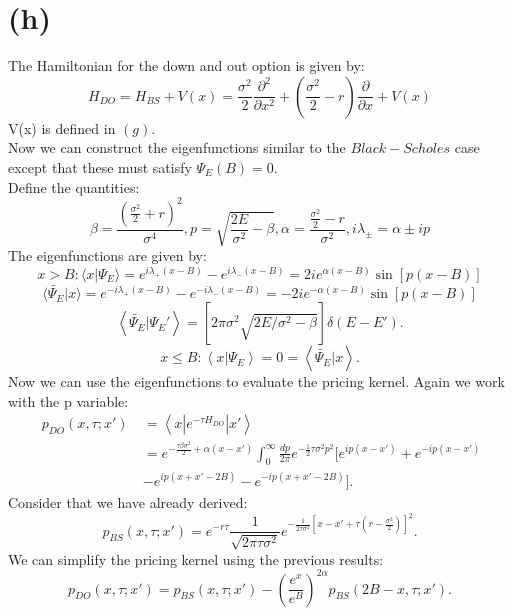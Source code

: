 \documentclass[12pt,a4paper]{paper}
\begin{document}
\section{(h)}
\indent The Hamiltonian for the down and out option is given by:
\begin{equation}
H_{DO}=H_{BS}+V(x)=\frac{\sigma ^2}{2}\frac{\partial ^2}{\partial x^2}+(\frac{\sigma ^2}{2}-r)\frac{\partial}{\partial x}+V(x)
\end{equation}
V(x) is defined in $(g)$.\\
\indent Now we can construct the eigenfunctions similar to the $Black-Scholes$ case except that these must satisfy $\Psi _{E}(B)=0$.\\
\indent Define the quantities:
\begin{equation}
\beta =\frac{(\frac{\sigma ^2 }{2}+r)^2}{\sigma ^4}, p=\sqrt{\frac{2E}{\sigma ^2}-\beta},\alpha =\frac{\frac{\sigma ^2}{2}-r}{\sigma ^2}, i\lambda _{\pm}=\alpha \pm ip
\end{equation}
\indent The eigenfunctions are given by:
\begin{equation}
x>B:\langle x|\Psi_{E}\rangle =e^{i\lambda_{+}(x-B)}-e^{i\lambda_{-}(x-B)}=2ie^{\alpha (x-B)}\sin{[p(x-B)]}
\end{equation}
\begin{equation}
\langle \widetilde{\Psi_{E}}|x\rangle =e^{-i\lambda_{+}(x-B)}-e^{-i\lambda_{-}(x-B)}=-2ie^{-\alpha (x-B)}\sin{[p(x-B)]}
\end{equation}
\begin{equation}
\left \langle \widetilde{\Psi _{E}} | {\Psi_{E}}' \right \rangle=[2\pi \sigma ^2 \sqrt{2E/\sigma ^2 -\beta }] \delta (E-{E}').
\end{equation}
\begin{equation}
x \leq B: \left \langle x | \Psi _{E} \right \rangle=0=\left \langle \widetilde{\Psi _{E}} | x \right \rangle.
\end{equation}
\indent Now we can use the eigenfunctions to evaluate the pricing kernel. Again we work with the p variable:
\begin{align*}
\ p_{DO}(x,\tau;{x}')\
& =  \left \langle x | e^{-\tau H_{DO}} | {x}' \right \rangle \\
& = e^{-\frac{\tau \beta \sigma ^2}{2}+\alpha (x-{x}')}\int_{0}^{\infty }\frac{dp}{2\pi }e^{-\frac{1}{2}\tau \sigma ^2 p^2} [e^{ip(x-{x}')}+e^{-ip(x-{x}')}\\
& -e^{ip(x+{x}'-2B)}-e^{-ip(x+{x}'-2B)}].\
\end{align*}
\indent Consider that we have already derived:
\begin{equation}
p_{BS}(x,\tau;{x}')=e^{-r\tau}\frac{1}{\sqrt{2\pi \tau \sigma ^2}}e^{-\frac{1}{2\tau \sigma ^2}[x-{x}'+\tau(r-\frac{\sigma ^2}{2})]^2}.
\end{equation}
We can simplify the pricing kernel using the previous results:
\begin{equation}
p_{DO}(x,\tau;{x}')=p_{BS}(x,\tau;{x}')-(\frac{e^{x}}{e^{B}})^{2\alpha } p_{BS}(2B-x,\tau;{x}').
\end{equation}
\end{document}
